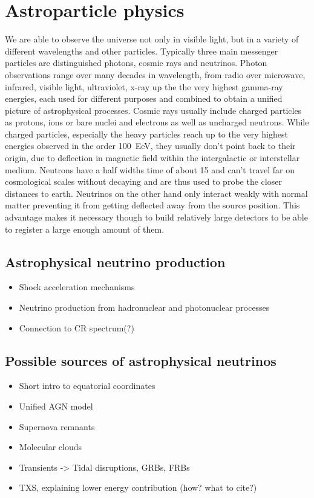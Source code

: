 \chapter{Astroparticle physics}

We are able to observe the universe not only in visible light, but in a variety of different wavelengths and other particles.
Typically three main messenger particles are distinguished photons, cosmic rays and neutrinos.
Photon observations range over many decades in wavelength, from radio over microwave, infrared, visible light, ultraviolet, x-ray up the the very highest gamma-ray energies, each used for different purposes and combined to obtain a unified picture of astrophysical processes.
Cosmic rays usually include charged particles as protons, ions or bare nuclei and electrons as well as uncharged neutrons.
While charged particles, especially the heavy particles reach up to the very highest energies observed in the order \SI{100}{\exa\eV}, they usually don't point back to their origin, due to deflection in magnetic field within the intergalactic or interstellar medium.
Neutrons have a half widths time of about \SI{15}{\min} and can't travel far on cosmological scales without decaying and are thus used to probe the closer distances to earth.
Neutrinos on the other hand only interact weakly with normal matter preventing it from getting deflected away from the source position.
This advantage makes it necessary though to build relatively large detectors to be able to register a large enough amount of them.

\section{Astrophysical neutrino production}
\begin{itemize}
  \item Shock acceleration mechanisms
  \item Neutrino production from hadronuclear and photonuclear processes
  \item Connection to CR spectrum(?)
\end{itemize}

\section{Possible sources of astrophysical neutrinos}
\begin{itemize}
  \item Short intro to equatorial coordinates
  \item Unified AGN model
  \item Supernova remnants
  \item Molecular clouds
  \item Transients -> Tidal disruptions, GRBs, FRBs
  \item TXS, explaining lower energy contribution (how? what to cite?)
\end{itemize}